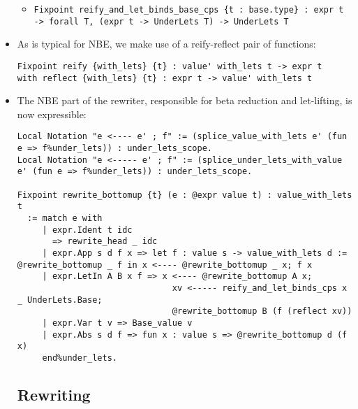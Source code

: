 \documentclass[
]{article}
\providecommand{\tightlist}{%
  \setlength{\itemsep}{0pt}\setlength{\parskip}{0pt}}
\begin{document}
\begin{itemize}
  \begin{itemize}
  \tightlist
  \item
    \texttt{Fixpoint\ reify\_and\_let\_binds\_base\_cps\ \{t\ :\ base.type\}\ :\ expr\ t\ -\textgreater{}\ forall\ T,\ (expr\ t\ -\textgreater{}\ UnderLets\ T)\ -\textgreater{}\ UnderLets\ T}
  \end{itemize}
\item
  As is typical for NBE, we make use of a reify-reflect pair of
  functions:

\begin{verbatim}
Fixpoint reify {with_lets} {t} : value' with_lets t -> expr t
with reflect {with_lets} {t} : expr t -> value' with_lets t
\end{verbatim}
\item
  The NBE part of the rewriter, responsible for beta reduction and
  let-lifting, is now expressible:

\begin{verbatim}
Local Notation "e <---- e' ; f" := (splice_value_with_lets e' (fun e => f%under_lets)) : under_lets_scope.
Local Notation "e <----- e' ; f" := (splice_under_lets_with_value e' (fun e => f%under_lets)) : under_lets_scope.

Fixpoint rewrite_bottomup {t} (e : @expr value t) : value_with_lets t
  := match e with
     | expr.Ident t idc
       => rewrite_head _ idc
     | expr.App s d f x => let f : value s -> value_with_lets d := @rewrite_bottomup _ f in x <---- @rewrite_bottomup _ x; f x
     | expr.LetIn A B x f => x <---- @rewrite_bottomup A x;
                               xv <----- reify_and_let_binds_cps x _ UnderLets.Base;
                               @rewrite_bottomup B (f (reflect xv))
     | expr.Var t v => Base_value v
     | expr.Abs s d f => fun x : value s => @rewrite_bottomup d (f x)
     end%under_lets.
\end{verbatim}

  \hypertarget{rewriting}{%
  \subsection{Rewriting}\label{rewriting}}

  \hypertarget{there-are-three-parts-and-one-additional-detail-to-rewriting}{%
}
\end{itemize}
\end{document}
